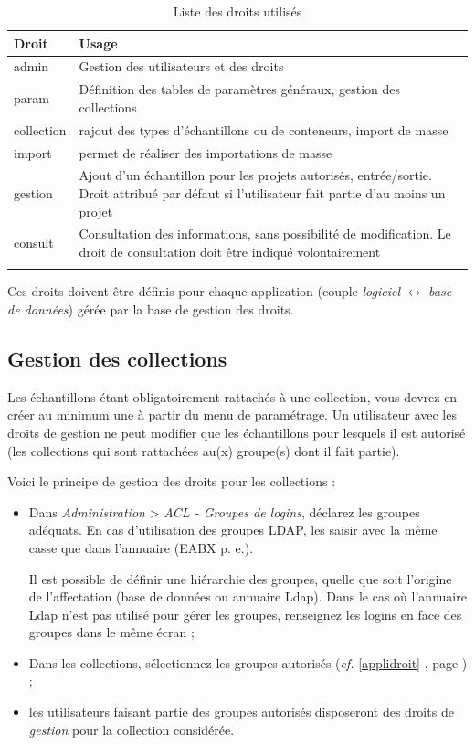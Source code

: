\begin{longtable}{|p{5cm}|p{10cm}|}
\hline
\textbf{Droit} & \textbf{Usage} \\
\hline
\endhead
admin &	Gestion des utilisateurs et des droits\\
\hline
param &	Définition des tables de paramètres généraux, gestion des collections\\
\hline
collection & rajout des types d'échantillons ou de conteneurs, import de masse \\
\hline
import & permet de réaliser des importations de masse \\
\hline
gestion &	Ajout d'un échantillon pour les projets autorisés, entrée/sortie. Droit attribué par défaut si l'utilisateur fait partie d'au moins un projet \\
\hline
consult	& Consultation des informations, sans possibilité de modification. Le droit de consultation doit être indiqué volontairement\\
\hline

\caption{\label{droitsCollec}Liste des droits utilisés}
\end{longtable}

Ces droits doivent être définis pour chaque application (couple \textit{logiciel} $\leftrightarrow$ \textit{base de données}) gérée par la base de gestion des droits.

\subsection{Gestion des collections}
\label{projet}

Les échantillons étant obligatoirement rattachés à une collcction, vous devrez en créer au minimum une à partir du menu de paramétrage. Un utilisateur avec les droits de gestion ne peut modifier que les échantillons pour lesquels il est autorisé (les collections qui sont rattachées au(x) groupe(s) dont il fait partie).

Voici le principe de gestion des droits pour les collections :
\begin{itemize}
\item Dans \textit{Administration} > \textit{ACL - Groupes de logins}, déclarez les groupes adéquats. En cas d'utilisation des groupes LDAP, les saisir avec la même casse que dans l'annuaire (EABX p. e.).

Il est possible de définir une hiérarchie des groupes, quelle que soit l'origine de l'affectation (base de données ou annuaire Ldap).
Dans le cas où l'annuaire Ldap n'est pas utilisé pour gérer les groupes, renseignez les logins en face des groupes dans le même écran ;
\item Dans les collections, sélectionnez les groupes autorisés (\textit{cf.} \ref{applidroit} \textit{}, page \pageref{applidroit}) ;
\item les utilisateurs faisant partie des groupes autorisés disposeront des droits de \textit{gestion} pour la collection considérée.
\end{itemize}

